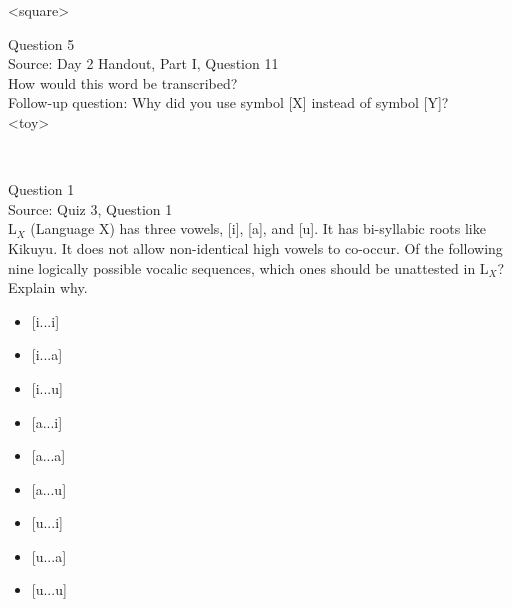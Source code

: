 \documentclass[12pt]{article}
\begin{document}
<square>


\newpage

{\large Question 5}\\

Source: Day 2 Handout, Part I, Question 11\\

How would this word be transcribed?\\ Follow-up question: Why did you use symbol [X] instead of symbol [Y]?\\

<toy>


\newpage

\begin{center}
\textbf{{\color{red}{\HUGE END OF EXAM}}}\\

\end{center}
\newpage

\begin{center}
\textbf{{\color{blue}{\HUGE START OF EXAM\\}}}

\textbf{{\color{blue}{\HUGE Student ID: 8079\\}}}

\textbf{{\color{blue}{\HUGE 12:00 noon - 12:15 PM\\}}}

\end{center}
\newpage

{\large Question 1}\\

Source: Quiz 3, Question 1\\

L$_X$ (Language X) has three vowels, [i], [a], and [u]. It has bi-syllabic roots like Kikuyu. It does not allow non-identical high vowels to co-occur. Of the following nine logically possible vocalic sequences, which ones should be unattested in L$_X$? Explain why.\\

\begin{itemize} \item {[i...i]} \item {[i...a]} \item {[i...u]} \item {[a...i]} \item {[a...a]} \item {[a...u]} \item {[u...i]} \item {[u...a]} \item {[u...u]} \end{itemize}
\end{document}
